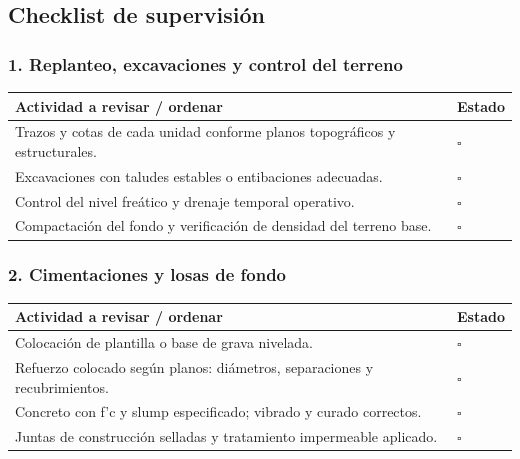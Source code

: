 \documentclass[12pt]{article}
\newcommand{\cbox}{\(\square\)} %
\begin{document}
	
	\subsection{Checklist de supervisión}
	
	\subsubsection*{1. Replanteo, excavaciones y control del terreno}
	\begin{tabularx}{\linewidth}{>{\raggedright\arraybackslash}p{0.93\linewidth} >{\centering\arraybackslash}m{0.07\linewidth}}
		\toprule
		\textbf{Actividad a revisar / ordenar} & \textbf{Estado}\\
		\midrule
		Trazos y cotas de cada unidad conforme planos topográficos y estructurales. & \cbox \\
		Excavaciones con taludes estables o entibaciones adecuadas. & \cbox \\
		Control del nivel freático y drenaje temporal operativo. & \cbox \\
		Compactación del fondo y verificación de densidad del terreno base. & \cbox \\
		\bottomrule
	\end{tabularx}
	
	\subsubsection*{2. Cimentaciones y losas de fondo}
	\begin{tabularx}{\linewidth}{>{\raggedright\arraybackslash}p{0.93\linewidth} >{\centering\arraybackslash}m{0.07\linewidth}}
		\toprule
		\textbf{Actividad a revisar / ordenar} & \textbf{Estado}\\
		\midrule
		Colocación de plantilla o base de grava nivelada. & \cbox \\
		Refuerzo colocado según planos: diámetros, separaciones y recubrimientos. & \cbox \\
		Concreto con f’c y slump especificado; vibrado y curado correctos. & \cbox \\
		Juntas de construcción selladas y tratamiento impermeable aplicado. & \cbox \\
		\bottomrule
	\end{tabularx}
	
\end{document}
